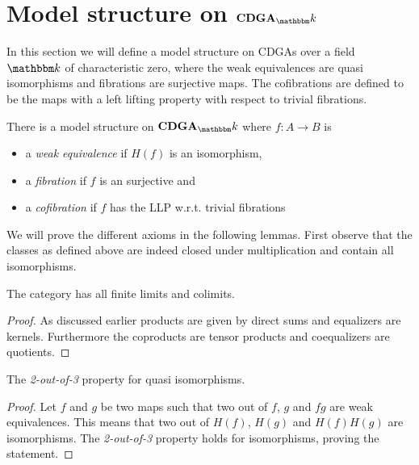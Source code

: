 
\section{Model structure on $\CDGA_\k$}


In this section we will define a model structure on CDGAs over a field $\k$ of characteristic zero, where the weak equivalences are quasi isomorphisms and fibrations are surjective maps. The cofibrations are defined to be the maps with a left lifting property with respect to trivial fibrations.

\begin{proposition}
	There is a model structure on $\CDGA_\k$ where $f: A \to B$ is
	\begin{itemize}
		\item a \emph{weak equivalence} if $H(f)$ is an isomorphism,
		\item a \emph{fibration} if $f$ is an surjective and
		\item a \emph{cofibration} if $f$ has the LLP w.r.t. trivial fibrations
	\end{itemize}
\end{proposition}

We will prove the different axioms in the following lemmas. First observe that the classes as defined above are indeed closed under multiplication and contain all isomorphisms.

\begin{lemma}
	[MC1] The category has all finite limits and colimits.
\end{lemma}
\begin{proof}
	As discussed earlier  products are given by direct sums and equalizers are kernels. Furthermore the coproducts are tensor products and coequalizers are quotients.
\end{proof}

\begin{lemma}
	[MC2] The \emph{2-out-of-3} property for quasi isomorphisms.
\end{lemma}
\begin{proof}
	Let $f$ and $g$ be two maps such that two out of $f$, $g$ and $fg$ are weak equivalences. This means that two out of $H(f)$, $H(g)$ and $H(f)H(g)$ are isomorphisms. The \emph{2-out-of-3} property holds for isomorphisms, proving the statement.
\end{proof}

